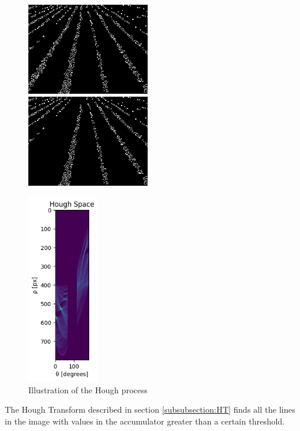 \begin{figure}[h!]
\begin{minipage}{0.48\columnwidth}
\includegraphics[width=\columnwidth,height=4cm]{Report/images/beforelineremoval.png.png}
\\[3mm]
\includegraphics[width=\columnwidth,height=4cm]{Report/images/afterlineremoval.png}
\end{minipage}
\hspace{0.15\columnwidth}
\begin{minipage}{0.3\columnwidth}
\includegraphics[width=\columnwidth,height=83mm]{Report/images/ImageProcesses/HoughSpacePerso/HTwithlabelconstraint.png}

\end{minipage}
\caption{Illustration of the Hough process}
\label{pics:diffHT}

\end{figure}


The Hough Transform described in section \ref{subsubsection:HT} finds all the lines in the image with values in the accumulator greater than a certain threshold.

